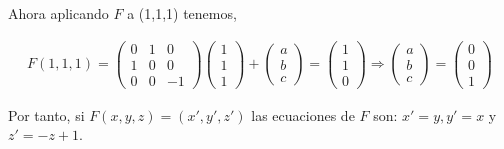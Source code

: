 Ahora aplicando $F$ a (1,1,1) tenemos,

\begin{gather*}
    F(1,1,1) = 
    \begin{pmatrix}
    0 & 1 & 0\\
    1 & 0 & 0\\
    0 & 0 & -1
    \end{pmatrix}
    \begin{pmatrix} 1\\1\\1 \end{pmatrix}
    + \begin{pmatrix}a\\b\\c \end{pmatrix}
    = \begin{pmatrix} 1\\1\\0 \end{pmatrix}
    \Longrightarrow
    \begin{pmatrix}a\\b\\c \end{pmatrix}
    = \begin{pmatrix} 0\\0\\1 \end{pmatrix}
\end{gather*}

Por tanto, si $F(x,y,z) = (x', y', z')$ las ecuaciones de $F$ son: $x' = y, y' = x$ y $z' = -z + 1$.